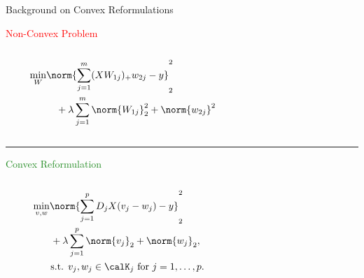 \documentclass[usenames,dvipsnames,mathserif,notheorems]{beamer}
\newcommand{\centerrule}{
	{
	\vspace{-0.5em}
	\center \rule{\textwidth}{0.1em}
	\vspace{-0.2em}
	}
}
\begin{document}
\begin{frame}{Background on Convex Reformulations}

	\vspace{0.2em}
	{\large \textcolor{Red}{Non-Convex Problem}}
	\vspace{-1em}
	\begin{columns}
		\centering
		\begin{column}{0.2\linewidth}
			\small
			\[
				\begin{aligned}
					\min_{W} & \norm{\sum_{j=1}^m (X W_{1j})_+ w_{2j} - y}_2^2                  \\
					         & \quad + \lambda \sum_{j=1}^m \norm{W_{1j}}_2^2 + \norm{w_{2j}}^2
				\end{aligned}
			\]
		\end{column}

		\begin{column}{0.7\linewidth}
			\begin{figure}[t]
				\raggedleft
				
			\end{figure}
		\end{column}
	\end{columns}


	\pause
	\centerrule


	{\large \textcolor{ForestGreen}{Convex Reformulation}} \citep{pilanci2020convex}
	\vspace{-2em}
	\begin{columns}
		\begin{column}{0.2\linewidth}
			\vspace{1.5em}
			\small
			\[
				\begin{aligned}
					\min_{v, w} & \norm{\sum_{j=1}^p D_j X (v_j - w_j) - y}_2^2                       \\
					            & \hspace{0.1em } + \lambda \sum_{j=1}^p \norm{v_j}_2 + \norm{w_j}_2, \\
					            & \hspace{0.1em} \text{s.t. }
					v_j, w_j \in \calK_j \text{ for } j = 1,\ldots,p.
				\end{aligned}
			\]
		\end{column}
		\begin{column}{0.7\linewidth}
			\vspace{-1.5em}
			\begin{figure}[t]
				\raggedleft
				
			\end{figure}
		\end{column}
	\end{columns}
\end{frame}
\end{document}

